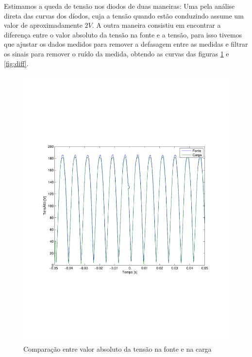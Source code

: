 \documentclass{report}
\begin{document}
Estimamos a queda de tensão nos diodos de duas maneiras: Uma pela análise direta das curvas dos díodos, cuja a tensão quando estão conduzindo assume um valor de aproximadamente $2 V$. A outra maneira consistiu em encontrar a diferença entre o valor absoluto da tensão na fonte e a tensão, para isso tivemos que ajustar os dados medidos para remover a defasagem entre as medidas e filtrar os sinais para remover o ruído da medida, obtendo as curvas das figuras \ref{fig:abs} e \ref{fig:diff}.

\begin{figure}[H]
	\centering
	\includegraphics[width=\linewidth]{dados/monofasico/abs}
	\caption{Comparação entre valor absoluto da tensão na fonte e na carga}
	\label{fig:abs}
\end{figure}
\end{document}
